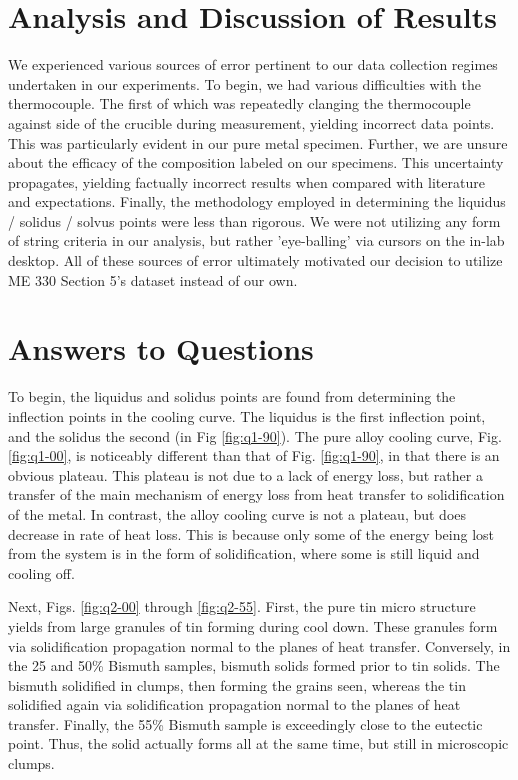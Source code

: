 \documentclass{article}
\begin{document}
\newpage
\section{Analysis and Discussion of Results}

We experienced various sources of error pertinent to our data collection regimes undertaken in our experiments. To begin, we had various difficulties with the thermocouple. The first of which was repeatedly clanging the thermocouple against side of the crucible during measurement, yielding incorrect data points. This was particularly evident in our pure metal specimen. Further, we are unsure about the efficacy of the composition labeled on our specimens. This uncertainty propagates, yielding factually incorrect results when compared with literature and expectations. Finally, the methodology employed in determining the liquidus / solidus / solvus points were less than rigorous. We were not utilizing any form of string criteria in our analysis, but rather 'eye-balling' via cursors on the in-lab desktop. All of these sources of error ultimately motivated our decision to utilize ME 330 Section 5's dataset instead of our own.

\newpage
\section{Answers to Questions}

To begin, the liquidus and solidus points are found from determining the inflection points in the cooling curve. The liquidus is the first inflection point, and the solidus the second (in Fig \ref{fig:q1-90}). The pure alloy cooling curve, Fig. \ref{fig:q1-00}, is noticeably different than that of Fig. \ref{fig:q1-90}, in that there is an obvious plateau. This plateau is not due to a lack of energy loss, but rather a transfer of the main mechanism of energy loss from heat transfer to solidification of the metal. In contrast, the alloy cooling curve is not a plateau, but does decrease in rate of heat loss. This is because only some of the energy being lost from the system is in the form of solidification, where some is still liquid and cooling off.

Next, Figs. \ref{fig:q2-00} through \ref{fig:q2-55}. First, the pure tin micro structure yields from large granules of tin forming during cool down. These granules form via solidification propagation normal to the planes of heat transfer. Conversely, in the 25 and 50\% Bismuth samples, bismuth solids formed prior to tin solids. The bismuth solidified in clumps, then forming the grains seen, whereas the tin solidified again via solidification propagation normal to the planes of heat transfer. Finally, the 55\% Bismuth sample is exceedingly close to the eutectic point. Thus, the solid actually forms all at the same time, but still in microscopic clumps.
\end{document}
